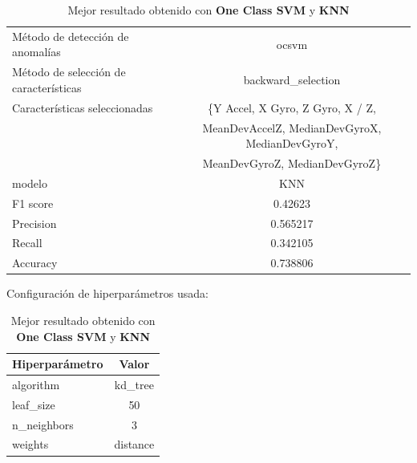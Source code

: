 \begin{appendices}
		\begin{table}[htb]
			\centering
			\caption{Mejor resultado obtenido con \textbf{One Class SVM} y \textbf{KNN}}
			\label{table:20}
			\begin{tabular}{lc}
				\toprule
				\midrule
					  Método de detección de anomalías &                                              ocsvm \\
				Método de selección de características &                                 backward\_selection \\
						 Características seleccionadas & 					\{Y Accel, X Gyro, Z Gyro, X / Z, \\
						 							   &	MeanDevAccelZ, MedianDevGyroX, MedianDevGyroY,   \\
													   &	MeanDevGyroZ, MedianDevGyroZ\} \\
												modelo &                                                KNN \\
											  F1 score &                                            0.42623 \\
											 Precision &                                           0.565217 \\
												Recall &                                           0.342105 \\
											  Accuracy &                                           0.738806 \\
				\bottomrule
			\end{tabular}
			\newline
			\newline
			Configuración de hiperparámetros usada:
			\begin{tabular}{lc}
				\toprule
				Hiperparámetro &    Valor \\
				\midrule
					 algorithm &  kd\_tree \\
					 leaf\_size &       50 \\
				   n\_neighbors &        3 \\
					   weights & distance \\
				\bottomrule
			\end{tabular}
			
		\end{table}
	

\end{appendices}
